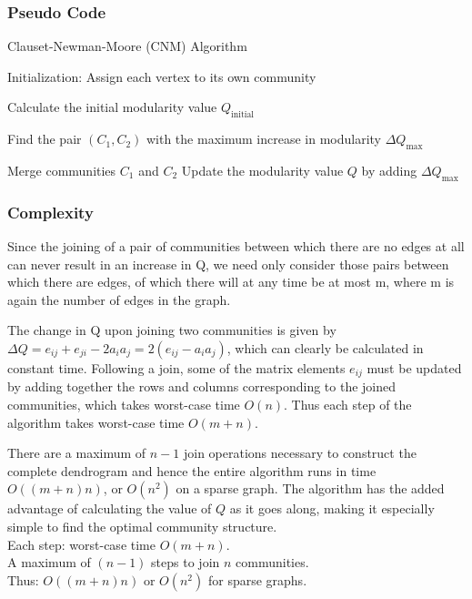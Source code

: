 \subsubsection{Pseudo Code}
\begin{algorithm}[H]
\caption{Clauset-Newman-Moore (CNM) Algorithm}
\SetAlgoLined
{}
Initialization: Assign each vertex to its own community\;

Calculate the initial modularity value \( Q_{\text{initial}} \)\;


Find the pair \( (C_1, C_2) \) with the maximum increase in modularity \( \Delta Q_{\text{max}} \)\;

Merge communities \( C_1 \) and \( C_2 \)\;
Update the modularity value \( Q \) by adding \( \Delta Q_{\text{max}} \)\;
\end{algorithm}

\subsubsection{Complexity}
Since the joining of a pair of communities between which there are no edges at all can never result in an increase in Q, we need only consider those pairs between which there are edges, of which there will at any time be at most m, where m is again the number of edges in the graph. 

The change in Q upon joining two communities is given by $\Delta Q = e_{ij} + e_{ji} - 2a_{i}a_{j} = 2(e_{ij} - a_{i}a_{j})$, which can clearly be calculated in constant time. 
Following a join, some of the matrix elements $e_{ij}$ must be updated by adding together the rows and columns corresponding to the joined communities, which takes worst-case time $O(n)$. Thus each step of the algorithm takes worst-case time $O(m + n)$. 

There are a maximum of $n - 1$ join operations necessary to construct the complete dendrogram and hence the entire algorithm runs in time $O((m + n)n)$, or $O(n^{2})$ on a sparse graph. The algorithm has the added advantage of calculating the value of $Q$ as it goes along, making it especially simple to find the optimal community structure.\\
Each step: worst-case time $O(m + n)$.\\
A maximum of $(n - 1)$ steps to join $n$ communities.\\
Thus: $O((m + n)n)$ or $O(n^{2})$ for sparse graphs.

